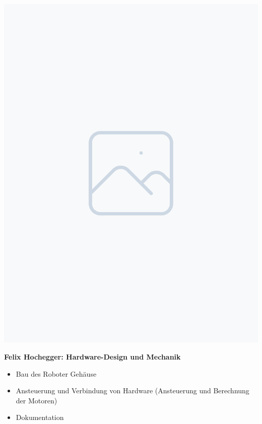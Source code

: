 \documentclass[ngerman,12pt,a4paper]{article}
\begin{document}
\begin{center}
\begin{minipage}{0.65\textwidth}
\begin{itemize}
				\end{itemize}
			\end{minipage} \\[1cm]
			\begin{minipage}{0.2\textwidth}
				\includegraphics[width=\linewidth]{Pictures/placeholder}
				\label{fig:felix}
			\end{minipage}
			\hfill
			\begin{minipage}{0.65\textwidth}
				\vspace{-60pt}
				\textbf{Felix Hochegger: Hardware-Design und Mechanik}
				\begin{itemize}
					\item Bau des Roboter Gehäuse \vspace{-10pt}
					\item Ansteuerung und Verbindung von Hardware (Ansteuerung und Berechnung der Motoren) \vspace{-10pt}
					\item Dokumentation \vspace{-10pt}
				\end{itemize}
			\end{minipage}
			\end{center}
			\newpage
\end{document}
